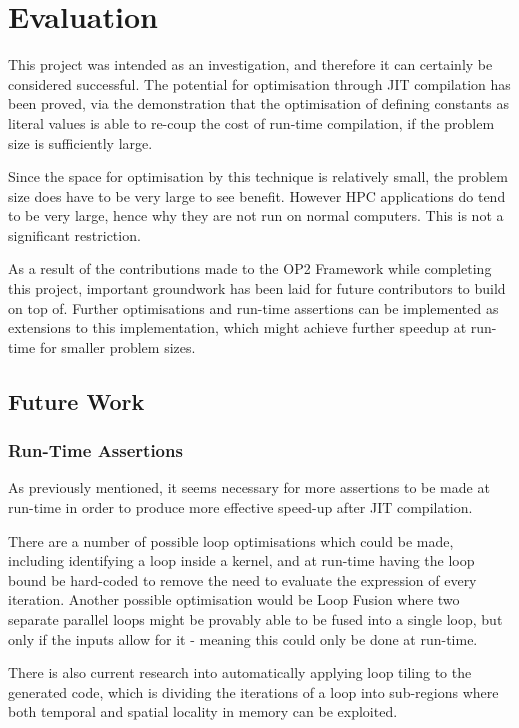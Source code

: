 
\section{Evaluation}
\label{s:eval}

This project was intended as an investigation, and therefore it can certainly be considered successful. The potential for optimisation through JIT compilation has been proved, via the demonstration that the optimisation of defining constants as literal values is able to re-coup the cost of run-time compilation, if the problem size is sufficiently large.
\par
Since the space for optimisation by this technique is relatively small, the problem size does have to be very large to see benefit. However HPC applications do tend to be very large, hence why they are not run on normal computers. This is not a significant restriction.
\par
As a result of the contributions made to the OP2 Framework while completing this project, important groundwork has been laid for future contributors to build on top of. Further optimisations and run-time assertions can be implemented as extensions to this implementation, which might achieve further speedup at run-time for smaller problem sizes.

\subsection{Future Work}
\label{ss:fw}

\subsubsection{Run-Time Assertions}
As previously mentioned, it seems necessary for more assertions to be made at run-time in order to produce more effective speed-up after JIT compilation. \par
There are a number of possible loop optimisations which could be made, including identifying a loop inside a kernel, and at run-time having the loop bound be hard-coded to remove the need to evaluate the expression of every iteration. Another possible optimisation would be Loop Fusion where two separate parallel loops might be provably able to be fused into a single loop, but only if the inputs allow for it - meaning this could only be done at run-time.

\noindent There is also current research into automatically applying loop tiling to the generated code, which is dividing the iterations of a loop into sub-regions where both temporal and spatial locality in memory can be exploited. \par

